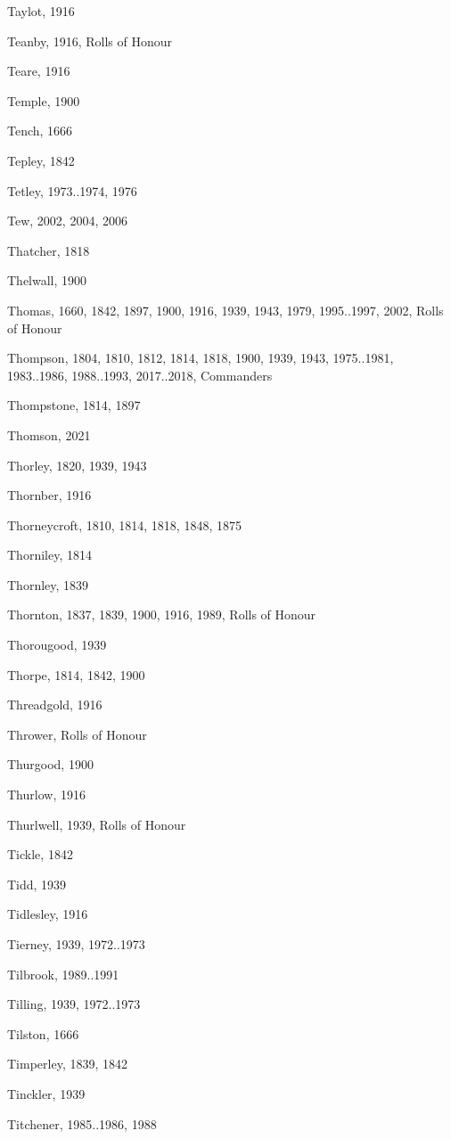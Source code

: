 {\begin{theindex}
\item Taylot, 1916
\item Teanby, 1916, Rolls of Honour
\item Teare, 1916
\item Temple, 1900
\item Tench, 1666
\item Tepley, 1842
\item Tetley, 1973..1974, 1976
\item Tew, 2002, 2004, 2006
\item Thatcher, 1818
\item Thelwall, 1900
\item Thomas, 1660, 1842, 1897, 1900, 1916, 1939, 1943, 1979, 1995..1997, 2002, Rolls of Honour
\item Thompson, 1804, 1810, 1812, 1814, 1818, 1900, 1939, 1943, 1975..1981, 1983..1986, 1988..1993, 2017..2018, Commanders
\item Thompstone, 1814, 1897
\item Thomson, 2021
\item Thorley, 1820, 1939, 1943
\item Thornber, 1916
\item Thorneycroft, 1810, 1814, 1818, 1848, 1875
\item Thorniley, 1814
\item Thornley, 1839
\item Thornton, 1837, 1839, 1900, 1916, 1989, Rolls of Honour
\item Thorougood, 1939
\item Thorpe, 1814, 1842, 1900
\item Threadgold, 1916
\item Thrower, Rolls of Honour
\item Thurgood, 1900
\item Thurlow, 1916
\item Thurlwell, 1939, Rolls of Honour
\item Tickle, 1842
\item Tidd, 1939
\item Tidlesley, 1916
\item Tierney, 1939, 1972..1973
\item Tilbrook, 1989..1991
\item Tilling, 1939, 1972..1973
\item Tilston, 1666
\item Timperley, 1839, 1842
\item Tinckler, 1939
\item Titchener, 1985..1986, 1988

\end{theindex}}
